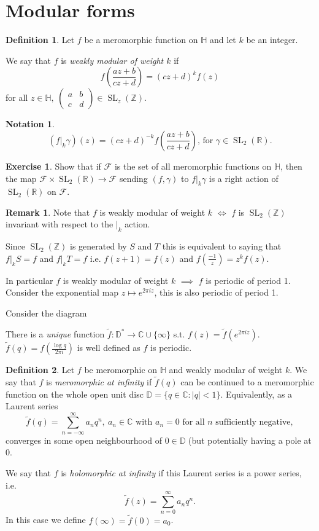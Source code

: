 \documentclass{article}
\theoremstyle{definition}
\newtheorem*{defn}{Definition}
\newtheorem*{exer}{Exercise}
\newtheorem*{rem}{Remark}
\newtheorem*{nota}{Notation}
\DeclareMathOperator{\SL}{SL}
\begin{document}
\section{Modular forms}
\begin{defn}
Let $f$ be a meromorphic function on $\mathbb{H}$ and let $k$ be an integer.

We say that $f$ is \emph{weakly modular of weight $k$} if
\[f\left(\frac{az+b}{cz+d}\right)= (cz+d)^kf(z)\] for all $z\in\mathbb{H},\ \begin{pmatrix}a&b\\c&d\end{pmatrix} \in\SL_z(\mathbb{Z})$.
\end{defn}

\begin{nota}
\[(f|_k\gamma)(z)=(cz+d)^{-k}f\left(\frac{az+b}{cz+d}\right)\text{, for }\gamma\in\SL_2(\mathbb{R}).\]
\end{nota}

\begin{exer}
Show that if $\mathcal{F}$ is the set of all meromorphic functions on $\mathbb{H}$, then the map $\mathcal{F}\times\SL_2(\mathbb{R})\to \mathcal{F}$ sending $(f,\gamma)$ to $f|_k\gamma$ is a right action of $\SL_2(\mathbb{R})$ on $\mathcal{F}$.
\end{exer}

\begin{rem}
Note that $f$ is weakly modular of weight $k$ $\iff$ $f$ is $\SL_2(\mathbb{Z})$ invariant with respect to the $|_k$ action.

Since $\SL_2(\mathbb{Z})$ is generated by $S$ and $T$ this is equivalent to saying that $f|_k S = f$ and $f|_k T = f$ i.e. $f(z+1) = f(z)$ and $f(\frac{-1}{z}) = z^kf(z)$.
\end{rem}

In particular $f$ is weakly modular of weight $k$ $\implies$ $f$ is periodic of period 1.
Consider the exponential map $z\mapsto e^{2\pi i z}$, this is also periodic of period 1.

Consider the diagram

There is a \emph{unique} function $\tilde f \colon \mathbb{D}^* \to \mathbb{C}\cup\{\infty\}$ s.t. $f(z) = \tilde f(e^{2\pi i z})$.
$\tilde f(q) = f(\frac{\log q}{2\pi i})$ is well defined as $f$ is periodic.

\begin{defn}
Let $f$ be meromorphic on $\mathbb{H}$ and weakly modular of weight $k$.
We say that $f$ is \emph{meromorphic at infinity} if $\tilde f(q)$ can be continued to a meromorphic function on the whole open unit disc $\mathbb{D} = \{q\in \mathbb{C}\colon |q|< 1\}$.
Equivalently, as a Laurent series
\[\tilde f(q) = \sum_{n=-\infty}^{\infty} a_nq ^n,\ a_n\in\mathbb{C}\text{ with }a_n = 0\text{ for all $n$ sufficiently negative},\]
converges in some open neighbourhood of $0\in\mathbb{D}$ (but potentially having a pole at 0.

We say that $f$ is \emph{holomorphic at infinity} if this Laurent series is a power series, i.e.
\[\tilde{f}(z) = \sum_{n=0}^{\infty} a_nq^n.\]
In this case we define $f(\infty) = \tilde f(0) = a_0$.
\end{defn}
\end{document}
